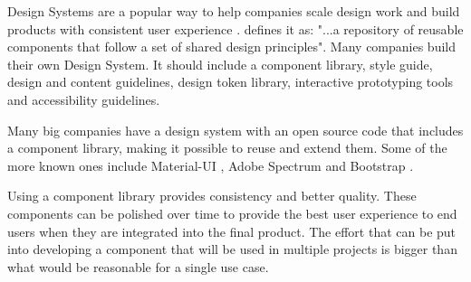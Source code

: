 \documentclass{master_thesis}
\begin{document}
Design Systems are a popular way to help companies scale design work and build products with consistent user experience \citep{Yew2020}. \citeauthor{Yew2020} defines it as: "...a repository of reusable components that follow a set of shared design principles". Many companies build their own Design System. It should include a component library, style guide, design and content guidelines, design token library, interactive prototyping tools and accessibility guidelines.

Many big companies have a design system with an open source code that includes a component library, making it possible to reuse and extend them. Some of the more known ones include Material-UI \citep{MUS}, Adobe Spectrum \citep{Adobe} and Bootstrap \citep{Collings}.




Using a component library provides consistency and better quality. These components can be polished over time to provide the best user experience to end users when they are integrated into the final product. The effort that can be put into developing a component that will be used in multiple projects is bigger than what would be reasonable for a single use case.
\end{document}

